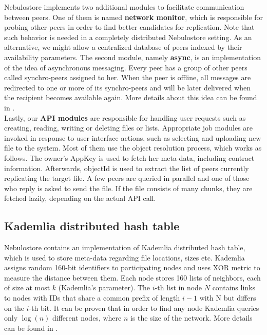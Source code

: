 \documentclass{pracamgren}
\begin{document}
Nebulostore implements two additional modules to facilitate communication between peers. One of them is named {\bf network monitor}, which is responsible for probing other peers in order to find better candidates for replication. Note that such behavior is needed in a completely distributed Nebulostore setting. As an alternative, we might allow a centralized database of peers indexed by their availability parameters. The second module, namely {\bf async}, is an implementation of the idea of asynchronous messaging. Every peer has a group of other peers called synchro-peers assigned to her. When the peer is offline, all messages are redirected to one or more of its synchro-peers and will be later delivered when the recipient becomes available again. More details about this idea can be found in \cite{hetero}.\\

Lastly, our {\bf API modules} are responsible for handling user requests such as creating, reading, writing or deleting files or lists. Appropriate job modules are invoked in response to user interface actions, such as selecting and uploading new file to the system. Most of them use the object resolution process, which works as follows. The owner's AppKey is used to fetch her meta-data, including contract information. Afterwards, objectId is used to extract the list of peers currently replicating the target file. A few peers are queried in parallel and one of those who reply is asked to send the file. If the file consists of many chunks, they are fetched lazily, depending on the actual API call.\\

\subsection{Kademlia distributed hash table}\label{sect:kademlia}

Nebulostore contains an implementation of Kademlia distributed hash table, which is used to store meta-data regarding file locations, sizes etc. Kademlia assigns random 160-bit identifiers to participating nodes and uses XOR metric to measure the distance between them. Each node stores 160 lists of neighbors, each of size at most $k$ (Kademlia's parameter). The $i$-th list in node $N$ contains links to nodes with IDs that share a common prefix of length $i-1$ with N but differs on the $i$-th bit. It can be proven that in order to find any node Kademlia queries only $\log(n)$ different nodes, where $n$ is the size of the network. More details can be found in \cite{kademlia}.\\
\end{document}
